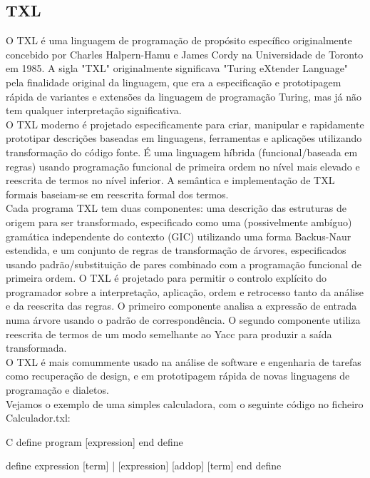 \documentclass[runningheads,a4paper]{llncs}
\begin{document}
\begin{multicols}{2}
\subsection{TXL}
O TXL é uma linguagem de programação de propósito específico originalmente concebido por Charles Halpern-Hamu e James Cordy na Universidade de Toronto em 1985. A sigla "TXL" originalmente significava "Turing eXtender Language" pela finalidade original da linguagem, que era a especificação e prototipagem rápida de variantes e extensões da linguagem de programação Turing, mas já não tem qualquer interpretação significativa.\\
O TXL moderno é projetado especificamente para criar, manipular e rapidamente prototipar descrições baseadas em linguagens, ferramentas e aplicações utilizando transformação do código fonte. É uma linguagem híbrida (funcional/baseada em regras) usando programação funcional de primeira ordem no nível mais elevado e reescrita de termos no nível inferior. A semântica e implementação de TXL formais baseiam-se em reescrita formal dos termos.\\
Cada programa TXL tem duas componentes: uma descrição das estruturas de origem para ser transformado, especificado como uma (possivelmente ambíguo) gramática independente do contexto (GIC) utilizando uma forma Backus-Naur estendida, e um conjunto de regras de transformação de árvores, especificados usando padrão/substituição de pares combinado com a programação funcional de primeira ordem. O TXL é projetado para permitir o controlo explícito do programador sobre a interpretação, aplicação, ordem e retrocesso tanto da análise e da reescrita das regras. O primeiro componente analisa a expressão de entrada numa árvore usando o padrão de correspondência. O segundo componente utiliza reescrita de termos de um modo semelhante ao Yacc para produzir a saída transformada.\\
O TXL é mais comummente usado na análise de software e engenharia de tarefas como recuperação de design, e em prototipagem rápida de novas linguagens de programação e dialetos.\\
Vejamos o exemplo de uma simples calculadora, com o seguinte código no ficheiro Calculador.txl:\\
\begin{myCode}{C}
define program
        [expression]
end define 
                  
define expression
        [term]
    |   [expression] [addop] [term]
end define 
                  

\end{myCode}
\end{multicols}
\end{document}
